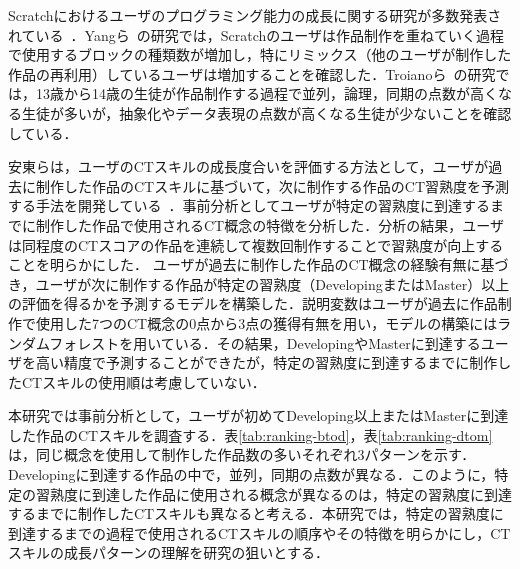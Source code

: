 \documentclass[submit,ses,noauthor]{ipsj}
\begin{document}

Scratchにおけるユーザのプログラミング能力の成長に関する研究が多数発表されている~\cite{Yang_2015}\cite{Troiano_2019}\cite{Ando_2021}\cite{Troiano_2019-2}\cite{ICSE16_Aivalglou}．Yangら~\cite{Yang_2015}の研究では，Scratchのユーザは作品制作を重ねていく過程で使用するブロックの種類数が増加し，特にリミックス（他のユーザが制作した作品の再利用）しているユーザは増加することを確認した．Troianoら~\cite{Troiano_2019}の研究では，13歳から14歳の生徒が作品制作する過程で並列，論理，同期の点数が高くなる生徒が多いが，抽象化やデータ表現の点数が高くなる生徒が少ないことを確認している．

安東らは，ユーザのCTスキルの成長度合いを評価する方法として，ユーザが過去に制作した作品のCTスキルに基づいて，次に制作する作品のCT習熟度を予測する手法を開発している~\cite{Ando_2021}．事前分析としてユーザが特定の習熟度に到達するまでに制作した作品で使用されるCT概念の特徴を分析した．分析の結果，ユーザは同程度のCTスコアの作品を連続して複数回制作することで習熟度が向上することを明らかにした．
ユーザが過去に制作した作品のCT概念の経験有無に基づき，ユーザが次に制作する作品が特定の習熟度（DevelopingまたはMaster）以上の評価を得るかを予測するモデルを構築した．説明変数はユーザが過去に作品制作で使用した7つのCT概念の0点から3点の獲得有無を用い，モデルの構築にはランダムフォレストを用いている．その結果，DevelopingやMasterに到達するユーザを高い精度で予測することができたが，特定の習熟度に到達するまでに制作したCTスキルの使用順は考慮していない．

本研究では事前分析として，ユーザが初めてDeveloping以上またはMasterに到達した作品のCTスキルを調査する．表\ref{tab:ranking-btod}，表\ref{tab:ranking-dtom}は，同じ概念を使用して制作した作品数の多いそれぞれ3パターンを示す．Developingに到達する作品の中で，並列，同期の点数が異なる．このように，特定の習熟度に到達した作品に使用される概念が異なるのは，特定の習熟度に到達するまでに制作したCTスキルも異なると考える．本研究では，特定の習熟度に到達するまでの過程で使用されるCTスキルの順序やその特徴を明らかにし，CTスキルの成長パターンの理解を研究の狙いとする．
\end{document}
